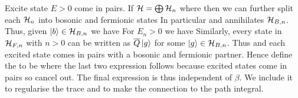 \documentclass{article}
\begin{document}
Excite state $E>0$ come in pairs. If $\mathcal{H} = \bigoplus \mathcal{H}_n$ where 
then we can further split each $\mathcal{H}_n$ into bosonic and fermionic states
In particular 
and annihilates $\mathcal{H}_{B,n}$. Thus, given $\ket{b} \in \mathcal{H}_{B,n}$ we have 
For $E_n > 0$ we have 
Similarly, every state in $\mathcal{H}_{F,n}$ with $n>0$ can be written as $\overline{Q} \ket{g}$ for some $\ket{g}\in\mathcal{H}_{B,n}$. Thus 
and each excited state comes in pairs with a bosonic and fermionic partner. Hence define the  to be 
where the last two expression follows because excited states come in pairs so cancel out. The final expression is thus independent of $\beta$. We include it to regularise the trace and to make the connection to the path integral. 

\end{document}
